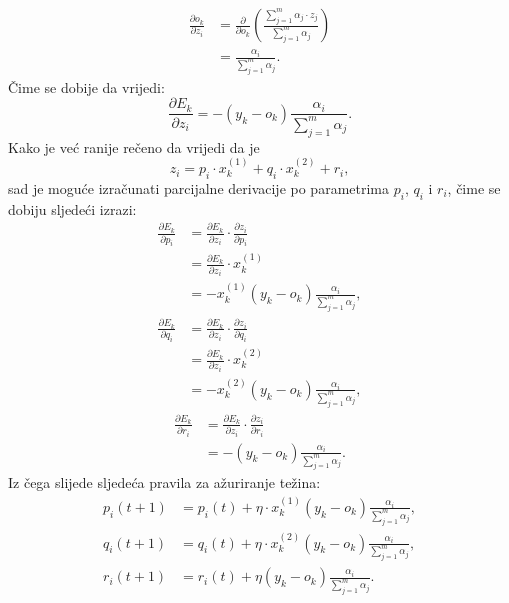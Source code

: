 \documentclass[12pt, a4paper, numeric]{article}
\begin{document}
\begin{equation*}
    \begin{split}
        \frac{\partial o_k}{\partial z_i}
            & = \frac{\partial}{\partial o_k}(
                \frac{\sum_{j=1}^{m}\alpha_j\cdot z_j}{\sum_{j=1}^{m}\alpha_j})\\
            & = \frac{\alpha_i}{\sum_{j=1}^{m}\alpha_j}.
    \end{split}
\end{equation*}
Čime se dobije da vrijedi:
\[
    \frac{\partial E_k}{\partial z_i} = -(y_k - o_k)\frac{\alpha_i}{\sum_{j=1}^{m}\alpha_j}.
\]
Kako je već ranije rečeno da vrijedi da je 
\[
    z_i = p_i\cdot x_k^{(1)} + q_i\cdot x_k^{(2)} + r_i,
\]
sad je moguće izračunati parcijalne derivacije po parametrima $p_i$, $q_i$ i $r_i$, čime se dobiju sljedeći izrazi:
\begin{equation*}
    \begin{split}
        \frac{\partial E_k}{\partial p_i}
            & = \frac{\partial E_k}{\partial z_i} \cdot \frac{\partial z_i}{\partial p_i}\\
            & = \frac{\partial E_k}{\partial z_i} \cdot x_k^{(1)}\\
            & = -x_k^{(1)}(y_k - o_k)\frac{\alpha_i}{\sum_{j=1}^{m}\alpha_j},
    \end{split}
\end{equation*}
\begin{equation*}
    \begin{split}
        \frac{\partial E_k}{\partial q_i}
            & = \frac{\partial E_k}{\partial z_i} \cdot \frac{\partial z_i}{\partial q_i}\\
            & = \frac{\partial E_k}{\partial z_i} \cdot x_k^{(2)}\\
            & = -x_k^{(2)}(y_k - o_k)\frac{\alpha_i}{\sum_{j=1}^{m}\alpha_j},
    \end{split}
\end{equation*}
\begin{equation*}
    \begin{split}
        \frac{\partial E_k}{\partial r_i}
            & = \frac{\partial E_k}{\partial z_i} \cdot \frac{\partial z_i}{\partial r_i}\\
            & = -(y_k - o_k)\frac{\alpha_i}{\sum_{j=1}^{m}\alpha_j}.
    \end{split}
\end{equation*}
Iz čega slijede sljedeća pravila za ažuriranje težina:
\begin{equation*}
    \begin{split}
        p_i(t + 1) &= p_i(t) + \eta\cdot x_k^{(1)}(y_k - o_k)\frac{\alpha_i}{\sum_{j=1}^{m}\alpha_j},\\
        q_i(t + 1) &= q_i(t) + \eta\cdot x_k^{(2)}(y_k - o_k)\frac{\alpha_i}{\sum_{j=1}^{m}\alpha_j},\\
        r_i(t + 1) &= r_i(t) + \eta(y_k - o_k)\frac{\alpha_i}{\sum_{j=1}^{m}\alpha_j}.
    \end{split}
\end{equation*}
\end{document}
